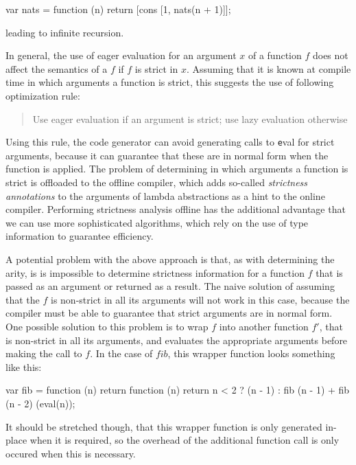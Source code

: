 \begin{CleanCode}
var nats = function (n) {
    return [cons [1, nats(n + 1)]];
}
\end{CleanCode}

leading to infinite recursion.

In general, the use of eager evaluation for an argument $x$ of a function $f$
does not affect the semantics of a $f$ if $f$ is strict in $x$. Assuming that it
is known at compile time in which arguments a function is strict, this suggests
the use of following optimization rule:

\begin{quote}
Use eager evaluation if an argument is strict; use lazy evaluation otherwise
\end{quote}

Using this rule, the code generator can avoid generating calls to {\texttt eval}
for strict arguments, because it can guarantee that these are in normal form
when the function is applied. The problem of determining in which arguments a
function is strict is offloaded to the offline compiler, which adds so-called
{\em strictness annotations} to the arguments of lambda abstractions as a hint
to the online compiler. Performing strictness analysis offline has the
additional advantage that we can use more sophisticated algorithms, which rely
on the use of type information to guarantee efficiency.

A potential problem with the above approach is that, as with determining the
arity, is is impossible to determine strictness information for a function $f$
that is passed as an argument or returned as a result. The naive solution of
assuming that the $f$ is non-strict in all its arguments will not work in this
case, because the compiler must be able to guarantee that strict arguments are
in normal form. One possible solution to this problem is to wrap $f$ into
another function $f'$, that is non-strict in all its arguments, and evaluates
the appropriate arguments before making the call to $f$. In the case of $fib$,
this wrapper function looks something like this:

\begin{CleanCode}
var fib = function (n) {
    return function (n) {
        return n < 2 ? (n - 1) : fib (n - 1) + fib (n - 2)
    }(eval(n));
}
\end{CleanCode}

It should be stretched though, that this wrapper function is only generated
in-place when it is required, so the overhead of the additional function call
is only occured when this is necessary.
